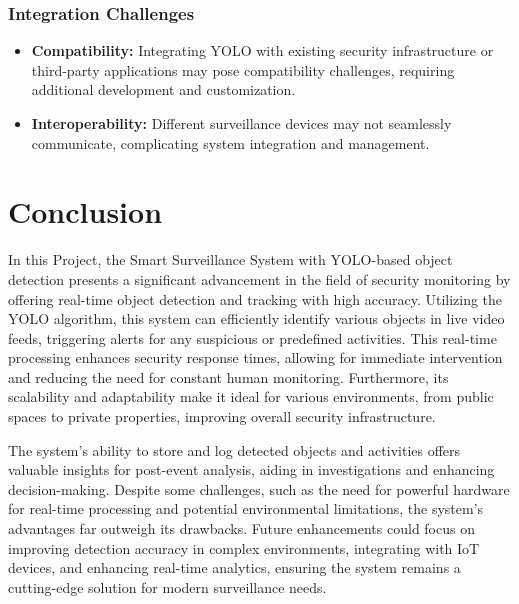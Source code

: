 \documentclass[openany,12pt]{report}
\begin{document}
\subsection*{Integration Challenges}
\begin{itemize}
    \item \textbf{Compatibility:} Integrating YOLO with existing security infrastructure or third-party applications may pose compatibility challenges, requiring additional development and customization.
    \item \textbf{Interoperability:} Different surveillance devices may not seamlessly communicate, complicating system integration and management.
\end{itemize}




\chapter{Conclusion}
\hspace*{0.5in}In this Project, the Smart Surveillance System with YOLO-based object detection presents a significant advancement in the field of security monitoring by offering real-time object detection and tracking with high accuracy. Utilizing the YOLO algorithm, this system can efficiently identify various objects in live video feeds, triggering alerts for any suspicious or predefined activities. This real-time processing enhances security response times, allowing for immediate intervention and reducing the need for constant human monitoring. Furthermore, its scalability and adaptability make it ideal for various environments, from public spaces to private properties, improving overall security infrastructure.

The system's ability to store and log detected objects and activities offers valuable insights for post-event analysis, aiding in investigations and enhancing decision-making. Despite some challenges, such as the need for powerful hardware for real-time processing and potential environmental limitations, the system's advantages far outweigh its drawbacks. Future enhancements could focus on improving detection accuracy in complex environments, integrating with IoT devices, and enhancing real-time analytics, ensuring the system remains a cutting-edge solution for modern surveillance needs.

\vspace{5in}
\newpage
{}
\end{document}
